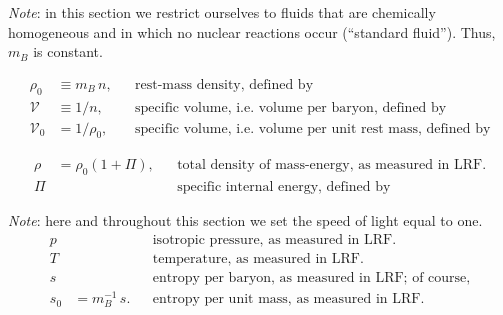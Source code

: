 \textit{Note}: in this section we restrict ourselves to fluids that are chemically
homogeneous and in which no nuclear reactions occur (``standard
fluid'').  Thus, $m_B$ is constant.

\begin{align}
\rho_0 &\equiv m_B\,n, && \text{rest-mass density, defined by}
\tag{2.5.2} \\[4pt]
\mathcal{V} &\equiv 1/n, && \text{specific volume, i.e.\ volume per baryon, defined by}
\tag{2.5.3} \\[4pt]
\mathcal{V}_0 &= 1/\rho_0, && \text{specific volume, i.e.\ volume per unit rest mass, defined by}
\tag{2.5.4}
\end{align}

\begin{align}
\rho &= \rho_0(1 + \Pi), && \text{total density of mass-energy, as measured in LRF.}
\tag{2.5.5}\\[4pt]
\Pi &\quad && \text{specific internal energy, defined by}
\tag*{}
\end{align}

\textit{Note}: here and throughout this section we set the speed of light equal to
one.
\begin{align}
p  &\quad && \text{isotropic pressure, as measured in LRF.}
\tag*{} \\
T  &\quad && \text{temperature, as measured in LRF.}
\tag*{} \\
s  &\quad && \text{entropy per baryon, as measured in LRF; of course,}
\tag*{} \\
s_0 &= m_B^{-1}\,s. && \text{entropy per unit mass, as measured in LRF.}
\tag{2.5.6}
\end{align}
